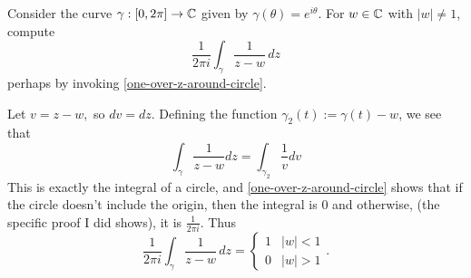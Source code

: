 \documentclass{homework}
\begin{document}
                                                                            \begin{problem}\label{one-over-z-w-around-circle}
                                                                              Consider the curve $\gamma : [0,2\pi] \to \mathbb{C}$ given by $\gamma(\theta) = e^{i\theta}$.  For $w \in \mathbb{C}$ with $|w| \neq 1$, compute
                                                                                \[
                                                                                    \frac{1}{2\pi i} \displaystyle\int_\gamma \frac{1}{z-w} \, dz
                                                                                      \]
                                                                                        perhaps by invoking \ref{one-over-z-around-circle}.
                                                                                        \end{problem}
                                                                                        \begin{solution}
                                                                                        Let $v = z - w,$ so $dv = dz$. Defining the function $\gamma_2(t) := \gamma(t) - w$, we see that 
                                                                                        \[\int_\gamma \frac{1}{z-w}dz =  \int_{\gamma_2} \frac{1}{v}dv\]
                                                                                        This is exactly the integral of a circle, and \ref{one-over-z-around-circle} shows that if the circle doesn't include the origin, then the integral is 0 and otherwise, (the specific proof I did shows), it is $\frac{1}{2\pi i}$. Thus
                                                                                        \[
                                                                                        \frac{1}{2\pi i} \displaystyle\int_\gamma \frac{1}{z-w} \, dz = \begin{cases}1 & |w| < 1\\ 0 & |w| > 1\end{cases}.
                                                                                        \]
                                                                                        \end{solution}
\end{document}
